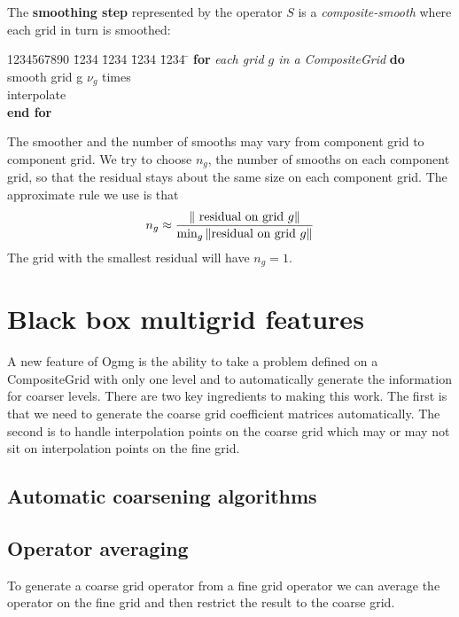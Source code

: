 \documentclass[11pt]{article}
\begin{document}
The {\bf smoothing step} represented by the operator $S$ 
is a {\sl composite-smooth} where each grid in turn
is smoothed:
\begin{tabbing}
1234567890 \= 1234 \= 1234 \= 1234 \= 1234 \=  \kill  %
\> {\bf for } {\it each grid $g$ in a CompositeGrid} {\bf do}                   \\
\>\>  smooth grid g $\nu_g$ times       \\
\>\>  interpolate \\
\> {\bf end for}
\end{tabbing}
The smoother and the number of smooths may vary from component grid to
component grid. We try
to choose $n_g$, the number of smooths on each component grid, so that the
residual stays about the same size on each component grid. The approximate rule
we use is that
\[
    n_g \approx { \| \text{ residual on grid $g$} \| \over \min_g \| \text{residual on grid $g$} \| }
\]
The grid with the smallest residual will have $n_g=1$. 



\section{Black box multigrid features}

A new feature of Ogmg is the ability to take a problem defined on a CompositeGrid
with only one level and to automatically generate the information for coarser levels.
There are two key ingredients to making this work. The first is that we need to generate
the coarse grid coefficient matrices automatically. The second is to handle interpolation
points on the coarse grid which may or may not sit on interpolation points on the fine grid.

\subsection{Automatic coarsening algorithms}



\subsection{Operator averaging}


To generate a coarse grid operator from a fine grid operator we can
average the operator on the fine grid and then restrict the result
to the coarse grid.
\end{document}
